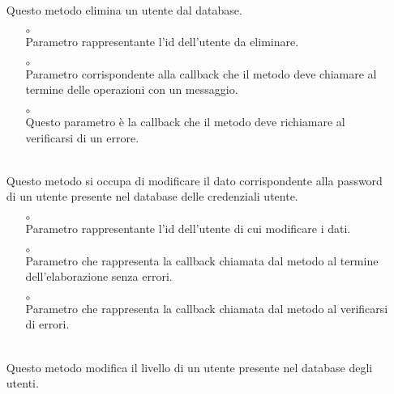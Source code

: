 \begin{itemize}
\begin{itemize}
\end{itemize}
\item[]  \\ Questo metodo elimina un utente dal database.
\begin{itemize}\addtolength{\itemsep}{-0.5\baselineskip}
\item[$\circ$]  \\ Parametro rappresentante l'id dell'utente da eliminare.
\item[$\circ$]  \\ Parametro corrispondente alla callback che il metodo deve chiamare al termine delle operazioni con un messaggio.
\item[$\circ$]  \\ Questo parametro è la callback che il metodo deve richiamare al verificarsi di un errore.
\end{itemize}
\item[]  \\ Questo metodo si occupa di modificare il dato corrispondente alla password di un utente presente nel database delle credenziali utente.
\begin{itemize}\addtolength{\itemsep}{-0.5\baselineskip}
\item[$\circ$]  \\ Parametro rappresentante l'id dell'utente di cui modificare i dati.
\item[$\circ$]  \\ Parametro che rappresenta la callback chiamata dal metodo al termine dell'elaborazione senza errori.
\item[$\circ$]  \\ Parametro che rappresenta la callback chiamata dal metodo al verificarsi di errori.
\end{itemize}
\item[]  \\ Questo metodo modifica il livello di un utente presente nel database degli utenti.
\begin{itemize}\addtolength{\itemsep}{-0.5\baselineskip}

\end{itemize}
\end{itemize}

